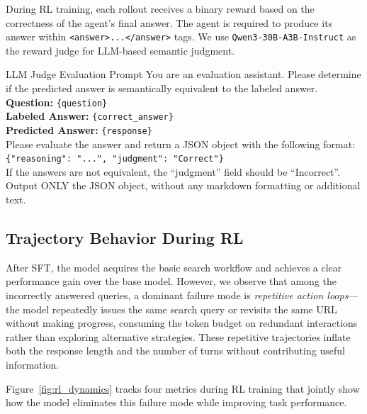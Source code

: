 \documentclass{article} %
\theoremstyle{plain}
\theoremstyle{definition}
\theoremstyle{remark}
\begin{document}
During RL training, each rollout receives a binary reward based on the correctness of the agent's final answer. The agent is required to produce its answer within \texttt{<answer>...</answer>} tags. We use \texttt{Qwen3-30B-A3B-Instruct} as the reward judge for LLM-based semantic judgment.



\begin{promptbox}{LLM Judge Evaluation Prompt}
You are an evaluation assistant. Please determine if the predicted answer is semantically equivalent to the labeled answer.\\[1ex]
\textbf{Question:} \texttt{\{question\}}\\[0.5ex]
\textbf{Labeled Answer:} \texttt{\{correct\_answer\}}\\[0.5ex]
\textbf{Predicted Answer:} \texttt{\{response\}}\\[1ex]
Please evaluate the answer and return a JSON object with the following format:\\[0.5ex]
\verb|{|\verb|"reasoning": "...", "judgment": "Correct"|\verb|}|\\[0.5ex]
If the answers are not equivalent, the ``judgment'' field should be ``Incorrect''.\\[0.5ex]
Output ONLY the JSON object, without any markdown formatting or additional text.
\end{promptbox}


\subsection{Trajectory Behavior During RL}

After SFT, the model acquires the basic search workflow and achieves a clear performance gain over the base model. However, we observe that among the incorrectly answered queries, a dominant failure mode is \emph{repetitive action loops}---the model repeatedly issues the same search query or revisits the same URL without making progress, consuming the token budget on redundant interactions rather than exploring alternative strategies. These repetitive trajectories inflate both the response length and the number of turns without contributing useful information.

Figure~\ref{fig:rl_dynamics} tracks four metrics during RL training that jointly show how the model eliminates this failure mode while improving task performance.
\end{document}
